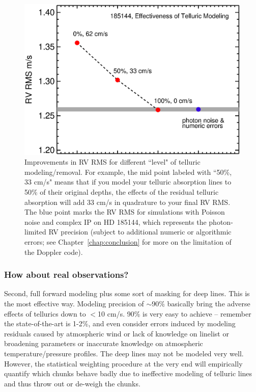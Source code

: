\begin{figure}
\includegraphics[scale=0.5]{telluric/neid.eps} 
\caption{Improvements in RV RMS for different ``level" of telluric
  modeling/removal. For example, the mid point labeled with ``50\%, 33 cm/s"
  means that if you model your telluric absorption lines to 50\% of
  their original depths, the effects of the residual telluric
  absorption will add 33 cm/s in quadrature to your final RV RMS. The
  blue point marks the RV RMS for simulations with Poisson noise and
  complex IP on HD 185144, which represents the photon-limited RV
  precision (subject to additional numeric or algorithmic errors; see
  Chapter~\ref{chap:conclusion} for more on the limitation of the
  Doppler code).
\label{telluric:fig:neid}}
\end{figure}

\subsubsection{How about real observations?}

Second, full forward modeling plus some sort of masking for deep
lines. This is the most effective way. Modeling precision of
$\sim$90\% basically bring the adverse effects of tellurics down to
$<$10 cm/s. 90\% is very easy to achieve -- remember the
state-of-the-art is 1-2\%, and even consider errors induced by
modeling residuals caused by atmospheric wind or lack of knowledge on
linelist or broadening parameters or inaccurate knowledge on atmospheric
temperature/pressure profiles. The deep lines may not be modeled very
well. However, the statistical weighting procedure at the very end
will empirically quantify which chunks behave badly due to ineffective
modeling of telluric lines and thus throw out or de-weigh the chunks.

